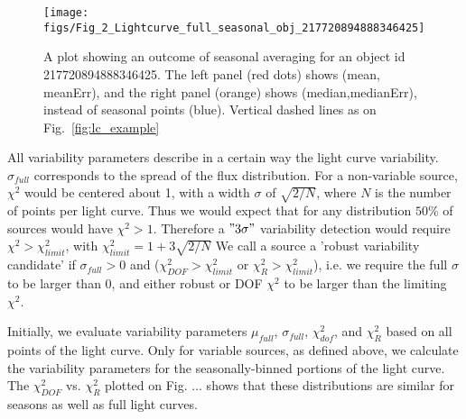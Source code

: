 \documentclass[fleqn,usenatbib]{mnras}  %
\begin{document}
\begin{figure*}

 \texttt{[image: figs/Fig\_2\_Lightcurve\_full\_seasonal\_obj\_217720894888346425]}
 \cprotect\caption{A plot showing an outcome of seasonal averaging for an object id 217720894888346425. The left panel (red dots) shows  (mean, meanErr),  and the right panel (orange) shows (median,medianErr), instead of seasonal points (blue). Vertical dashed lines as on Fig.~\ref{fig:lc_example}}
 \label{fig:lc_example_seasonal}
\end{figure*}


%
%

%
%

%
% 
All variability parameters describe in a certain way the light curve variability. $\sigma_{full}$  corresponds to the spread of the flux distribution. For a non-variable source, $\chi^{2}$ would be centered about 1, with a width $\sigma$ of $\sqrt{2/N}$, where $N$ is the number of points per light curve. Thus we would expect that for any distribution $50\%$ of sources would have $\chi^{2}>1$. Therefore a $"3\sigma"$ variability detection would require $\chi^{2} > \chi^{2}_{limit}$, with $\chi^{2}_{limit} = 1 + 3\sqrt{2/N}$
We call a source a 'robust variability candidate' if $\sigma_{full}>0$ and ($\chi^{2}_{DOF} > \chi^{2}_{limit}$ or $\chi^{2}_{R} > \chi^{2}_{limit}$), i.e. we require the full $\sigma$ to be larger than 0, and either robust or DOF $\chi^{2}$ to be larger than the limiting $\chi^{2}$. 

%
% 

Initially, we evaluate variability parameters $\mu_{full}$, $\sigma_{full}$, $\chi^{2}_{dof}$, and $\chi^{2}_{R}$ based on all points of the light curve. Only for variable sources, as defined above, we calculate the variability parameters for the seasonally-binned portions of the light curve. The $\chi^{2}_{DOF}$ vs. $\chi^{2}_{R}$ plotted on Fig. ...  shows that these distributions are similar for seasons as well as full light curves.    
\end{document}
